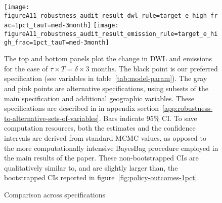 \begin{figure}[!bthp]
  \caption{Comparison across specifications}
  \label{fig:robustness-reg-spec}
  \texttt{[image: figureA11\_robustness\_audit\_result\_dwl\_rule=target\_e\_high\_frac=1pct\_tauT=med-3month]}
  \texttt{[image: figureA11\_robustness\_audit\_result\_emission\_rule=target\_e\_high\_frac=1pct\_tauT=med-3month]}

The top and bottom panels plot the change in \gls{DWL} and emissions for the case of \(\tau \times T = \delta \times \text{3 months}\).
The black point is our preferred specification
(see variables in table~\ref{tab:model-param}).
The gray and pink points are alternative specifications, using subsets of the main specification and additional geographic variables.
These specifications are described in in appendix section~\ref{app:robustness-to-alternative-sets-of-variables}.
Bars indicate 95\% \gls{CI}.
To save computation resources, both the estimates and the confidence intervals are derived from standard \gls{MCMC} values, as opposed to the more computationally intensive BayesBag procedure employed in the main results of the paper.
These non-bootstrapped CIs are qualitatively similar to, and are slightly larger than, the bootstrapped CIs reported in figure~\ref{fig:policy-outcomes-1pct}.
\end{figure}


\newpage

\begin{RaggedRight}
\singlespacing
\twocolumn


\printbibliography[notkeyword={code}, heading=subbibliography]

\newpage



\printbibliography[keyword={code}, heading=subbibliography, title={Software Citations}]
\end{RaggedRight}

